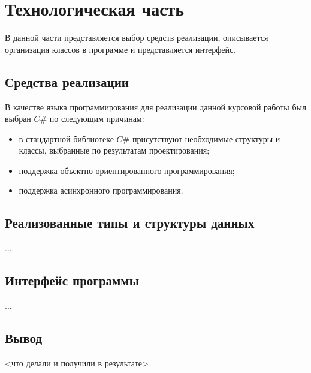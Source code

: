 \chapter{Технологическая часть}

В данной части представляется выбор средств реализации, описывается организация классов в программе и представляется интерфейс.

\section{Средства реализации}

В качестве языка программирования для реализации данной курсовой работы был выбран $C\#$ по следующим причинам:
\begin{itemize}[label=--]
	\item в стандартной библиотеке $C\#$ присутствуют необходимые структуры и классы, выбранные по результатам проектирования;
	\item поддержка объектно-ориентированного программирования;
	\item поддержка асинхронного программирования.
\end{itemize}

\section{Реализованные типы и структуры данных}

...

\section{Интерфейс программы}

...

\section*{Вывод}

<что делали и получили в результате>

\clearpage
